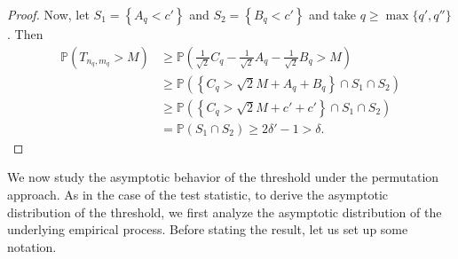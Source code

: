 \begin{proof}
Now, let $S_1 = \left\{A_q < c' \right\}$ and $S_2 = \left\{B_q < c' \right\}$ and take $q \geq \max\{q',q''\}$. Then
\begin{align*}
\mathbb{P}\left(T_{n_q, m_q} > M \right)
& \geq \mathbb{P}\left( \frac{1}{\sqrt{2}}C_q - \frac{1}{\sqrt{2}}A_q - \frac{1}{\sqrt{2}}B_q > M \right) \\
& \geq \mathbb{P}\left( \left\{C_q  > \sqrt{2}M + A_q + B_q\right\}\cap S_1\cap S_2 \right) \\
& \geq \mathbb{P}\left( \left\{C_q > \sqrt{2}M + c' + c'\right\}\cap S_1\cap S_2 \right) \\
& = \mathbb{P}\left( S_1\cap S_2\right) \geq 2\delta' - 1 > \delta.
\end{align*}




\end{proof}
We now study the asymptotic behavior of the threshold under the permutation approach. As in the case of the test statistic, to derive the asymptotic distribution of the threshold, we first analyze the asymptotic distribution of the underlying empirical process. Before stating the result, let us set up some notation.

